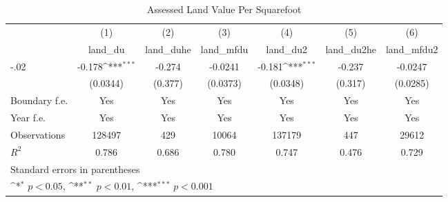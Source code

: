 \begin{table}[htbp]\centering
\def\sym#1{\ifmmode^{#1}\else\(^{#1}\)\fi}
\caption{Assessed Land Value Per Squarefoot}
\begin{tabular}{l*{6}{c}}
\hline\hline
                    &\multicolumn{1}{c}{(1)}&\multicolumn{1}{c}{(2)}&\multicolumn{1}{c}{(3)}&\multicolumn{1}{c}{(4)}&\multicolumn{1}{c}{(5)}&\multicolumn{1}{c}{(6)}\\
                    &\multicolumn{1}{c}{land\_du}&\multicolumn{1}{c}{land\_duhe}&\multicolumn{1}{c}{land\_mfdu}&\multicolumn{1}{c}{land\_du2}&\multicolumn{1}{c}{land\_du2he}&\multicolumn{1}{c}{land\_mfdu2}\\
\hline
-.02                &      -0.178\sym{***}&      -0.274         &     -0.0241         &      -0.181\sym{***}&      -0.237         &     -0.0247         \\
                    &    (0.0344)         &     (0.377)         &    (0.0373)         &    (0.0348)         &     (0.317)         &    (0.0285)         \\
[1em]
Boundary f.e.       &         Yes         &         Yes         &         Yes         &         Yes         &         Yes         &         Yes         \\
[1em]
Year f.e.           &         Yes         &         Yes         &         Yes         &         Yes         &         Yes         &         Yes         \\
\hline
Observations        &      128497         &         429         &       10064         &      137179         &         447         &       29612         \\
\(R^{2}\)           &       0.786         &       0.686         &       0.780         &       0.747         &       0.476         &       0.729         \\
\hline\hline
\multicolumn{7}{l}{\footnotesize Standard errors in parentheses}\\
\multicolumn{7}{l}{\footnotesize \sym{*} \(p<0.05\), \sym{**} \(p<0.01\), \sym{***} \(p<0.001\)}\\
\end{tabular}
\end{table}
